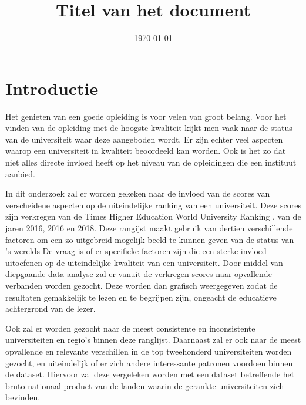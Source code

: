 \documentclass{uva-inf-article}
\title{Titel van het document}
\date{\today}
\begin{document}
\maketitle




\section{Introductie}
Het genieten van een goede opleiding is voor velen van groot belang. Voor het vinden van de opleiding met de hoogste kwaliteit kijkt men vaak naar de status van de universiteit waar deze aangeboden wordt. Er zijn echter veel aspecten waarop een universiteit in kwaliteit beoordeeld kan worden. Ook is het zo dat niet alles directe invloed heeft op het niveau van de opleidingen die een instituut aanbied.

In dit onderzoek zal er worden gekeken naar de invloed van de scores van verscheidene aspecten op de uiteindelijke ranking van een universiteit. Deze scores zijn verkregen van de Times Higher Education World University Ranking \cite{Times}, van de jaren 2016, 2016 en 2018. Deze rangijst maakt gebruik van dertien verschillende factoren om een zo uitgebreid mogelijk beeld te kunnen geven van de status van 's werelds  De vraag is of er specifieke factoren zijn die een sterke invloed uitoefenen op de uiteindelijke kwaliteit van een universiteit. Door middel van diepgaande data-analyse zal er vanuit de verkregen scores naar opvallende verbanden worden gezocht. Deze worden dan grafisch weergegeven zodat de resultaten gemakkelijk te lezen en te begrijpen zijn, ongeacht de educatieve achtergrond van de lezer.


Ook zal er worden gezocht naar de meest consistente en inconsistente universiteiten en regio's binnen deze ranglijst. Daarnaast zal er ook naar de meest opvallende en relevante verschillen in de top tweehonderd universiteiten worden gezocht, en uiteindelijk of er zich andere interessante patronen voordoen binnen de dataset. Hiervoor zal deze vergeleken worden met een dataset betreffende het bruto nationaal product van de landen waarin de gerankte universiteiten zich bevinden.
\end{document}
